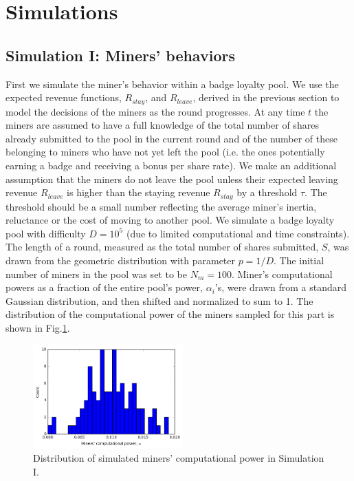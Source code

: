 \documentclass{article}
\theoremstyle{plain}
\theoremstyle{definition}
\begin{document}
\section{Simulations}

\subsection{Simulation I: Miners' behaviors}

First we simulate the miner's behavior within a badge loyalty pool. We use the expected revenue functions,
$R_{stay}$, and $R_{leave}$, derived in the previous section to model the decisions of the miners as 
the round progresses. At any time $t$ the miners are assumed to have a full knowledge of the total number 
of shares already submitted to the pool in the current round and of the number of these belonging to
miners who have not yet left the pool (i.e. the ones potentially earning a badge and receiving a bonus 
per share rate). We make an additional assumption that the miners do not leave the pool unless their 
expected leaving revenue $R_{leave}$ is higher than the staying revenue $R_{stay}$ by a threshold $\tau$.
The threshold should be a small number reflecting the average miner's inertia, reluctance or the cost
of moving to another pool. We simulate a badge loyalty pool with difficulty $D = 10^5$ (due 
to limited computational and time constraints). The length of a round, measured as the total number of
shares submitted, $S$, was drawn from the geometric distribution with parameter $p = 1/D$. 
The initial number of miners in the pool was set to be $N_m = 100$. Miner's computational powers
as a fraction of the entire pool's power, $\alpha_i$'s, were drawn from a standard Gaussian
distribution, and then shifted and normalized to sum to 1. The distribution of the computational
power of the miners sampled for this part is shown in Fig.\ref{fig:com_pow}.

\begin{figure}[H]
\center
\includegraphics[width = .6\textwidth, height = 4cm]{figures/comp_pow.png}
\caption{Distribution of simulated miners' computational power in Simulation I.}
\label{fig:com_pow}
\end{figure}
\end{document}
